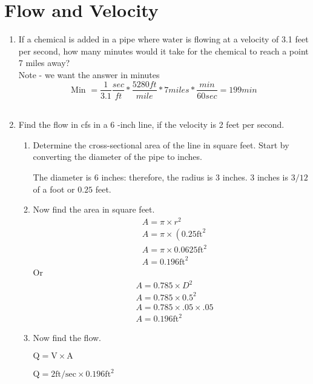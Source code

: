 \documentclass{article}
\begin{document}
\section{Flow and Velocity}
\begin{enumerate}

\item If a chemical is added in a pipe where water is flowing at a velocity of 3.1 feet per second, how many minutes would it take for the chemical to reach a point 7 miles away?  \\

Note - we want the answer in minutes\\

$$\textrm{Min } = \dfrac{1}{3.1}\dfrac{sec}{ft}*\dfrac{5280ft}{mile}*7 miles*\dfrac{min}{60 sec} = \boxed{199 min}$$
\\

\item Find the flow in cfs in a 6 -inch line, if the velocity is 2 feet per second.

\begin{enumerate}
\item Determine the cross-sectional area of the line in square feet. Start by converting the diameter of the pipe to inches.

The diameter is 6 inches: therefore, the radius is 3 inches. 3 inches is $3 / 12$ of a foot or $0.25$ feet.

\item Now find the area in square feet.
$$
\begin{aligned}
&A=\pi \times r^{2} \\
&A=\pi \times\left(0.25 \mathrm{ft}^{2}\right. \\
&A=\pi \times 0.0625 \mathrm{ft}^{2} \\
&A=0.196 \mathrm{ft}^{2}
\end{aligned}
$$
Or
$$
\begin{aligned}
&A=0.785 \times D^{2} \\
&A=0.785 \times 0.5^{2} \\
&A=0.785 \times .05 \times .05 \\
&A=0.196 \mathrm{ft}^{2}
\end{aligned}
$$

\item Now find the flow.

$\mathrm{Q}=\mathrm{V} \times \mathrm{A}$

$\mathrm{Q}=2 \mathrm{ft} / \mathrm{sec} \times 0.196 \mathrm{ft}^{2}$


\end{enumerate}
\end{enumerate}
\end{document}
